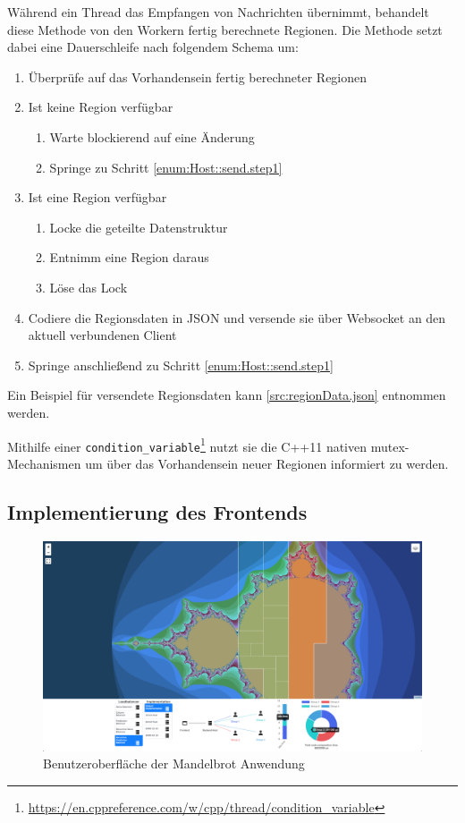 Während ein Thread das Empfangen von Nachrichten übernimmt, behandelt diese Methode von den Workern fertig berechnete Regionen.
Die Methode setzt dabei eine Dauerschleife nach folgendem Schema um:

\begin{enumerate}
    \item Überprüfe auf das Vorhandensein fertig berechneter Regionen \label{enum:Host::send.step1}
    \item Ist keine Region verfügbar
    \begin{enumerate}
        \item Warte blockierend auf eine Änderung
        \item Springe zu Schritt \ref{enum:Host::send.step1}
    \end{enumerate}
    \item Ist eine Region verfügbar
    \begin{enumerate}
        \item Locke die geteilte Datenstruktur
        \item Entnimm eine Region daraus
        \item Löse das Lock
    \end{enumerate}
    \item Codiere die Regionsdaten in JSON und versende sie über Websocket an den aktuell verbundenen Client
    \item Springe anschließend zu Schritt \ref{enum:Host::send.step1}
\end{enumerate}

Ein Beispiel für versendete Regionsdaten kann \autoref{src:regionData.json} entnommen werden.

Mithilfe einer \texttt{condition\_variable}\footnote{\url{https://en.cppreference.com/w/cpp/thread/condition_variable}}
nutzt sie die C++11 nativen mutex-Mechanismen um über das Vorhandensein neuer Regionen informiert zu werden.

\subsection{Implementierung des Frontends}

\begin{figure}[h!]
	\centering
	\includegraphics[width=\linewidth]{img/Implementierung/UI-Screenshot}
	\caption{Benutzeroberfläche der Mandelbrot Anwendung}
	\label{fig:ui-screenshot}
\end{figure}

